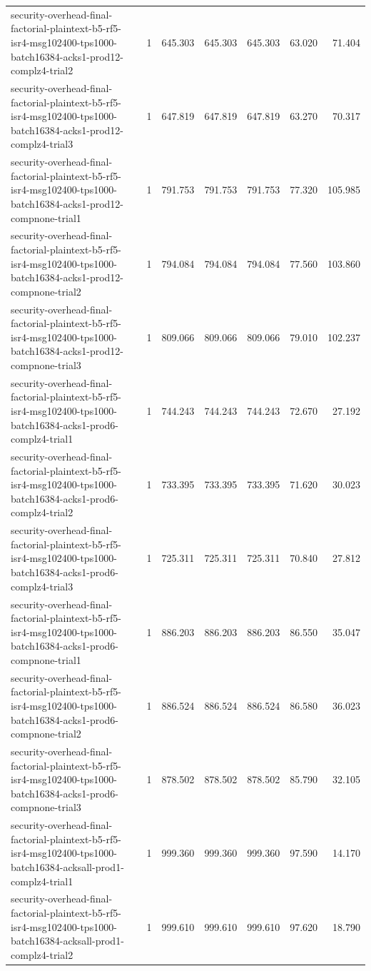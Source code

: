 \begin{tabular}{lrrrrrr}
security-overhead-final-factorial-plaintext-b5-rf5-isr4-msg102400-tps1000-batch16384-acks1-prod12-complz4-trial2 & 1 & 645.303 & 645.303 & 645.303 & 63.020 & 71.404 \\
security-overhead-final-factorial-plaintext-b5-rf5-isr4-msg102400-tps1000-batch16384-acks1-prod12-complz4-trial3 & 1 & 647.819 & 647.819 & 647.819 & 63.270 & 70.317 \\
security-overhead-final-factorial-plaintext-b5-rf5-isr4-msg102400-tps1000-batch16384-acks1-prod12-compnone-trial1 & 1 & 791.753 & 791.753 & 791.753 & 77.320 & 105.985 \\
security-overhead-final-factorial-plaintext-b5-rf5-isr4-msg102400-tps1000-batch16384-acks1-prod12-compnone-trial2 & 1 & 794.084 & 794.084 & 794.084 & 77.560 & 103.860 \\
security-overhead-final-factorial-plaintext-b5-rf5-isr4-msg102400-tps1000-batch16384-acks1-prod12-compnone-trial3 & 1 & 809.066 & 809.066 & 809.066 & 79.010 & 102.237 \\
security-overhead-final-factorial-plaintext-b5-rf5-isr4-msg102400-tps1000-batch16384-acks1-prod6-complz4-trial1 & 1 & 744.243 & 744.243 & 744.243 & 72.670 & 27.192 \\
security-overhead-final-factorial-plaintext-b5-rf5-isr4-msg102400-tps1000-batch16384-acks1-prod6-complz4-trial2 & 1 & 733.395 & 733.395 & 733.395 & 71.620 & 30.023 \\
security-overhead-final-factorial-plaintext-b5-rf5-isr4-msg102400-tps1000-batch16384-acks1-prod6-complz4-trial3 & 1 & 725.311 & 725.311 & 725.311 & 70.840 & 27.812 \\
security-overhead-final-factorial-plaintext-b5-rf5-isr4-msg102400-tps1000-batch16384-acks1-prod6-compnone-trial1 & 1 & 886.203 & 886.203 & 886.203 & 86.550 & 35.047 \\
security-overhead-final-factorial-plaintext-b5-rf5-isr4-msg102400-tps1000-batch16384-acks1-prod6-compnone-trial2 & 1 & 886.524 & 886.524 & 886.524 & 86.580 & 36.023 \\
security-overhead-final-factorial-plaintext-b5-rf5-isr4-msg102400-tps1000-batch16384-acks1-prod6-compnone-trial3 & 1 & 878.502 & 878.502 & 878.502 & 85.790 & 32.105 \\
security-overhead-final-factorial-plaintext-b5-rf5-isr4-msg102400-tps1000-batch16384-acksall-prod1-complz4-trial1 & 1 & 999.360 & 999.360 & 999.360 & 97.590 & 14.170 \\
security-overhead-final-factorial-plaintext-b5-rf5-isr4-msg102400-tps1000-batch16384-acksall-prod1-complz4-trial2 & 1 & 999.610 & 999.610 & 999.610 & 97.620 & 18.790 \\

\end{tabular}
